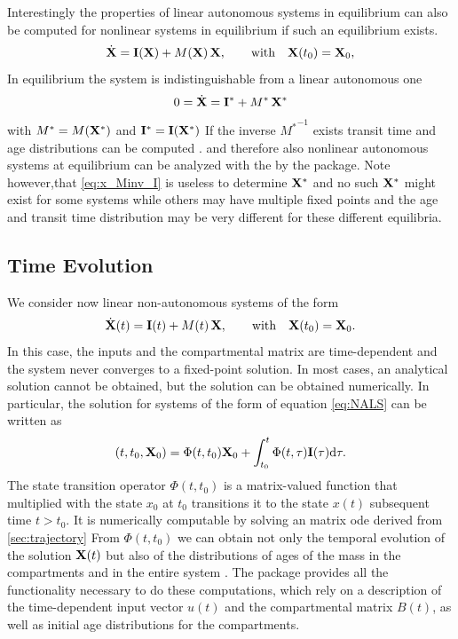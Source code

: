 Interestingly the properties of linear autonomous systems in equilibrium can
also be computed for nonlinear systems in equilibrium if such an equilibrium
exists.
\begin{equation} \label{eq:NLS}
\dot{\mathbf{X}} = \mathbf{I}(\mathbf{X}) + M(\mathbf{X}) \, \mathbf{X}, \qquad  \mathrm{with} \quad \mathbf{X}(t_0) = \mathbf{X}_0,
\end{equation}
In equilibrium the system is indistinguishable from a linear autonomous one
\begin{align} 
  0= \dot{\mathbf{X}} = \mathbf{I}^* + M^* \, \mathbf{X}^*
\end{align}
with $M^*=M(\mathbf{X}^*)$ and $\mathbf{I}^*=\mathbf{I}(\mathbf{X}^*)$ 
If the inverse ${M^*}^{-1}$ exists transit time and age distributions can be computed 
\citep{Metzler2018MGS}.
and therefore also  nonlinear autonomous
systems at equilibrium can be analyzed with the by the
\LAPM package.
Note however,that 
\eqref{eq:x_Minv_I} is useless to determine $\mathbf{X}^*$ and 
no such $\mathbf{X}^*$ might exist for some systems
while others may have multiple fixed points and the age and
transit time distribution may be very different for these different equilibria.

\subsection{Time Evolution} \label{sec:trajectory}
We consider now linear non-autonomous systems of the form
\begin{equation} \label{eq:NALS}
\dot{\mathbf{X}}(t) = \mathbf{I}(t) + M(t) \, \mathbf{X}, \qquad  \mathrm{with} \quad \mathbf{X}(t_0) = \mathbf{X}_0.
\end{equation}
In this case, the inputs and the compartmental matrix are time-dependent and
the system never converges to a fixed-point solution. In most cases, an
analytical solution cannot be obtained, but the solution can be 
obtained numerically. In particular, the solution for systems of the form of equation \eqref{eq:NALS} can be written as
\begin{equation}
(t, t_0, \mathbf{X}_0) = \Phi(t, t_0) \mathbf{X}_0 + \int_{t_0}^{t} \Phi(t, \tau) \mathbf{I}(\tau) \mathrm{d}\tau.
  \label{eqn:Phi}
\end{equation}
The state transition operator $\Phi(t,t_0)$ is a matrix-valued function that
multiplied with the state $x_0$ at $t_0$ transitions it to the state $x(t)$
subsequent time $t > t_0$. It is numerically computable by solving an matrix
ode derived from \eqref{sec:trajectory} 
From $\Phi(t,t_0)$ we can obtain not only the temporal evolution of the
solution $\mathbf{X}(t)$ but also of the distributions of ages of the mass in the compartments and in the entire system \citep{Metzler2018PNAS}.
The \CompartmentalSystems package provides all the functionality necessary to do these computations, which rely on a description of the time-dependent input vector $u(t)$ and the compartmental matrix $B(t)$, as well as initial age distributions for the compartments.

